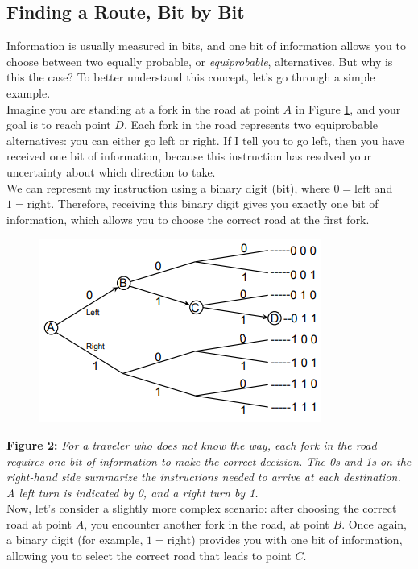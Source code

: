 \documentclass[12pt, oneside]{book}
\begin{document}
\subsection{Finding a Route, Bit by Bit}
Information is usually measured in bits, and one bit of information allows you to choose between two equally probable, or \textit{equiprobable}, alternatives. But why is this the case? To better understand this concept, let’s go through a simple example.\\
Imagine you are standing at a fork in the road at point \(A\) in Figure \ref{fig:1.2}, and your goal is to reach point \(D\). Each fork in the road represents two equiprobable alternatives: you can either go left or right. If I tell you to go left, then you have received one bit of information, because this instruction has resolved your uncertainty about which direction to take.\\
We can represent my instruction using a binary digit (bit), where \(0 = \text{left}\) and \(1 = \text{right}\). Therefore, receiving this binary digit gives you exactly one bit of information, which allows you to choose the correct road at the first fork.\\
\begin{figure}[h!]
	\centering
	\includegraphics[width=\linewidth]{./1.2.png}
	\label{fig:1.2}
\end{figure}
\textbf{Figure 2:} \textit{For a traveler who does not know the way, each fork in the road requires one bit of information to make the correct decision. The 0s and 1s on the right-hand side summarize the instructions needed to arrive at each destination. A left turn is indicated by 0, and a right turn by 1.}\\
Now, let’s consider a slightly more complex scenario: after choosing the correct road at point \(A\), you encounter another fork in the road, at point \(B\). Once again, a binary digit (for example, \(1 = \text{right}\)) provides you with one bit of information, allowing you to select the correct road that leads to point \(C\). \\
\end{document}
